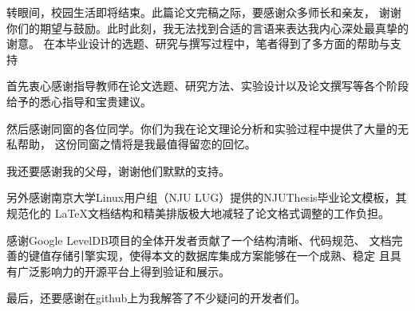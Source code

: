 \documentclass[
    type = bachelor,
    fontset = win,
    decl-page = true,
  ]{njuthesis}
\begin{document}
\printbibliography


\begin{acknowledgement}
  转眼间，校园生活即将结束。此篇论文完稿之际，要感谢众多师长和亲友，
  谢谢你们的期望与鼓励。此时此刻，我无法找到合适的言语来表达我内心深处最真挚的谢意。
  在本毕业设计的选题、研究与撰写过程中，笔者得到了多方面的帮助与支持 
  
  首先衷心感谢指导教师在论文选题、研究方法、实验设计以及论文撰写等各个阶段
  给予的悉心指导和宝贵建议。
  
  然后感谢同窗的各位同学。你们为我在论文理论分析和实验过程中提供了大量的无私帮助，
  这份同窗之情将是我最值得留恋的回忆。

  我还要感谢我的父母，谢谢他们默默的支持。

  另外感谢南京大学Linux用户组（NJU LUG）提供的NJUThesis毕业论文模板，其规范化的
  \LaTeX{}文档结构和精美排版极大地减轻了论文格式调整的工作负担。

  感谢Google LevelDB项目\cite{2}的全体开发者贡献了一个结构清晰、代码规范、
  文档完善的键值存储引擎实现，使得本文的数据库集成方案能够在一个成熟、稳定
  且具有广泛影响力的开源平台上得到验证和展示。

  最后，还要感谢在github上为我解答了不少疑问的开发者们。
\end{acknowledgement}
\end{document}
